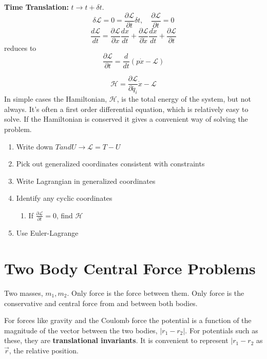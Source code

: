 \textbf{Time Translation: } $t\to t+\delta t$.
\begin{equation}
	\label{}
	\delta\mathcal{L}=0=\frac{\partial\mathcal{L}}{\partial t}\delta t,\quad \frac{\partial\mathcal{L}}{\partial t}=0
\end{equation}
\begin{equation}
	\label{}
	\frac{d\mathcal{L}}{dt}=\frac{\partial\mathcal{L}}{\partial x}\frac{dx}{dt}+\frac{\partial\mathcal{L}}{\partial\dot{x}}\frac{d\dot{x}}{dt}+\frac{\partial\mathcal{L}}{\partial t}
\end{equation}
reduces to
\begin{equation}
	\label{}
	\frac{\partial\mathcal{L}}{\partial t}=\frac{d}{dt}(p\dot{x}-\mathcal{L})
\end{equation}

\begin{equation}
	\label{}
	\mathcal{H}=\frac{\partial\mathcal{L}}{\partial \dot{q_{i}}}\dot{x}-\mathcal{L}
\end{equation}
In simple cases the Hamiltonian, $\mathcal{H}$, is the total energy of the system, but not always. It's often a first order differential equation, which is relatively easy to solve. If the Hamiltonian is conserved it gives a convenient way of solving the problem. 

\begin{enumerate}
	\item Write down $T and U\to\mathcal{L}=T-U$
	\item Pick out generalized coordinates consistent with constraints
	\item Write Lagrangian in generalized coordinates
	\item Identify any cyclic coordinates
		\begin{enumerate}
			\item If $\frac{\partial\mathcal{L}}{\partial t}=0$, find $\mathcal{H}	$
		\end{enumerate}
	\item Use Euler-Lagrange
\end{enumerate}

\section{Two Body Central Force Problems}

Two masses, $m_{1},m_{2}$. Only force is the force between them. Only force is the conservative and central force from and between both bodies. 

For forces like gravity and the Coulomb force the potential is a function of the magnitude of the vector between the two bodies, $|r_{1}-r_{2}|$. For potentials such as these, they are \textbf{translational invariants}. It is convenient to represent $|r_{1}-r_{2}$ as $\vec{r}$, the relative position.

